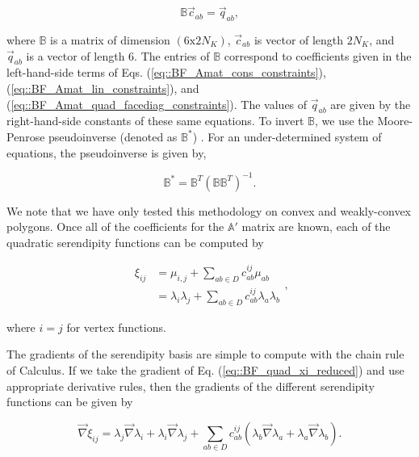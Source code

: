\documentclass[preprint,10pt]{elsarticle}
\begin{document}
\begin{equation}
\label{eq::BF_quad_MP_form}
\mathbb{B} \vec{c}_{ab} = \vec{q}_{ab}, 
\end{equation}

\noindent where $\mathbb{B}$ is a matrix of dimension $(6 \text{x} 2 N_K)$, $\vec{c}_{ab}$ is vector of length $2 N_K$, and $\vec{q}_{ab}$ is a vector of length 6. The entries of $\mathbb{B}$ correspond to coefficients given in the left-hand-side terms of Eqs. (\ref{eq::BF_Amat_cons_constraints}), (\ref{eq::BF_Amat_lin_constraints}), and (\ref{eq::BF_Amat_quad_facediag_constraints}). The values of $\vec{q}_{ab}$ are given by the right-hand-side constants of these same equations. To invert $\mathbb{B}$, we use the Moore-Penrose pseudoinverse (denoted as $\mathbb{B}^*$) \cite{penrose1955generalized}. For an under-determined system of equations, the pseudoinverse is given by,

\begin{equation}
\label{eq::BF_quad_MP_inverse}
\mathbb{B}^* = \mathbb{B}^T (\mathbb{B} \mathbb{B}^T)^{-1}.
\end{equation}

\noindent We note that we have only tested this methodology on convex and weakly-convex polygons. Once all of the coefficients for the $\mathbb{A}'$ matrix are known, each of the quadratic serendipity functions can be computed by

\begin{equation}
\label{eq::BF_quad_xi_reduced}
\begin{aligned}
\xi_{ij} &=  \mu_{i,j} + \sum_{ab \in D} c_{ab}^{ij} \mu_{ab} \\
&=  \lambda_i \lambda_j + \sum_{ab \in D} c_{ab}^{ij}\lambda_a \lambda_b
\end{aligned} ,
\end{equation}

\noindent where $i=j$ for vertex functions.

The gradients of the serendipity basis are simple to compute with the chain rule of Calculus. If we take the gradient of Eq. (\ref{eq::BF_quad_xi_reduced}) and use appropriate derivative rules, then the gradients of the different serendipity functions can be given by

\begin{equation}
\label{eq::BF_ser_gradient}
\vec{\nabla} \xi_{ij} = \lambda_j \vec{\nabla} \lambda_i + \lambda_i \vec{\nabla} \lambda_j + \sum_{ab \in D} c_{ab}^{ij} \left(  \lambda_b \vec{\nabla} \lambda_a + \lambda_a \vec{\nabla} \lambda_b \right) .
\end{equation}
\end{document}
